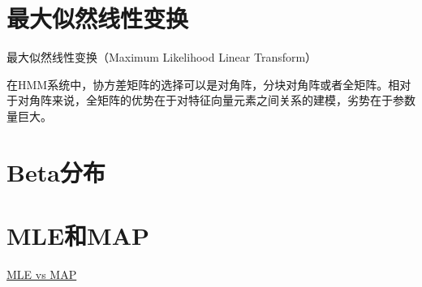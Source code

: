 \section{最大似然线性变换}
最大似然线性变换（Maximum Likelihood Linear Transform）

在HMM系统中，协方差矩阵的选择可以是对角阵，分块对角阵或者全矩阵。相对于对角阵来说，全矩阵的优势在于对特征向量元素之间关系的建模，劣势在于参数量巨大。

\section{Beta分布}
  
\section{MLE和MAP}

\href{https://wiseodd.github.io/techblog/2017/01/01/mle-vs-map/}{MLE vs MAP}

